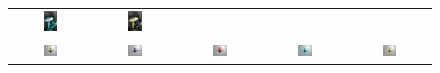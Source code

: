 \begin{figure}[t]
\begin{tabular}{@{}ccccc@{}}
\includegraphics[width=0.19\textwidth]{images/L2S_compare_region/mushroom_Li}	&
\includegraphics[width=0.19\textwidth]{images/L2S_compare_region/mushroom_ours}	
\\
\includegraphics[width=0.19\textwidth]{images/L2S_compare_region/Airplane_orig}	&
\includegraphics[width=0.19\textwidth]{images/L2S_compare_region/Airplane_CV}	&
\includegraphics[width=0.19\textwidth]{images/L2S_compare_region/Airplane_Lankton} &
\includegraphics[width=0.19\textwidth]{images/L2S_compare_region/Airplane_Li}	&
\includegraphics[width=0.19\textwidth]{images/L2S_compare_region/Airplane_ours}	

\end{tabular}
\end{figure}
